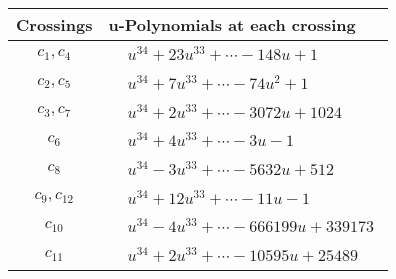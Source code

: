 \documentclass[1p]{elsarticle_modified}
\theoremstyle{definition}
\begin{document}
\begin{tabular}{m{50pt}|m{274pt}}
Crossings & \hspace{64pt}u-Polynomials at each crossing \\
\hline $$\begin{aligned}c_{1},c_{4}\end{aligned}$$&$\begin{aligned}
&u^{34}+23 u^{33}+\cdots-148 u+1
\end{aligned}$\\
\hline $$\begin{aligned}c_{2},c_{5}\end{aligned}$$&$\begin{aligned}
&u^{34}+7 u^{33}+\cdots-74 u^2+1
\end{aligned}$\\
\hline $$\begin{aligned}c_{3},c_{7}\end{aligned}$$&$\begin{aligned}
&u^{34}+2 u^{33}+\cdots-3072 u+1024
\end{aligned}$\\
\hline $$\begin{aligned}c_{6}\end{aligned}$$&$\begin{aligned}
&u^{34}+4 u^{33}+\cdots-3 u-1
\end{aligned}$\\
\hline $$\begin{aligned}c_{8}\end{aligned}$$&$\begin{aligned}
&u^{34}-3 u^{33}+\cdots-5632 u+512
\end{aligned}$\\
\hline $$\begin{aligned}c_{9},c_{12}\end{aligned}$$&$\begin{aligned}
&u^{34}+12 u^{33}+\cdots-11 u-1
\end{aligned}$\\
\hline $$\begin{aligned}c_{10}\end{aligned}$$&$\begin{aligned}
&u^{34}-4 u^{33}+\cdots-666199 u+339173
\end{aligned}$\\
\hline $$\begin{aligned}c_{11}\end{aligned}$$&$\begin{aligned}
&u^{34}+2 u^{33}+\cdots-10595 u+25489
\end{aligned}$\\
\hline
\end{tabular}\\~\\
\end{document}
